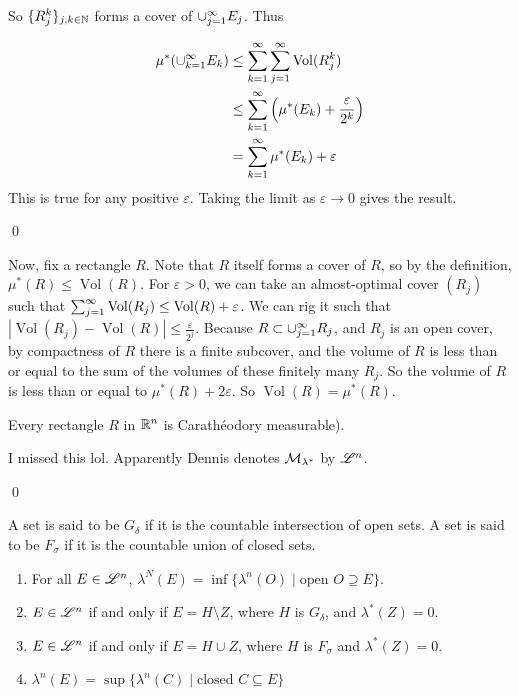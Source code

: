 \documentclass[x11names,reqno,14pt]{extarticle}
\newcommand{\seq}[1]{_{#1 = 1}^\oo}
\DeclareMathOperator{\Vol}{Vol}
\begin{document}
So $\{R^k_j\}_{j, k \in \mathbb{N}}$ forms a cover of $\cup\seq{j}E_j$. Thus

\begin{align*}
\mu^*(\cup\seq{k}E_k) & \leq \sum\seq{k}\sum\seq{j}\Vol(R_j^k) \\
& \leq \sum\seq{k}\left(\mu^*(E_k) + \frac{\varepsilon}{2^k}\right) \\
& = \sum\seq{k}\mu^*(E_k) + \varepsilon
\end{align*}
This is true for any positive $\varepsilon$. Taking the limit as $\varepsilon\to0$ gives the result. 

\qed

Now, fix a rectangle $R$. Note that $R$ itself forms a cover of $R$, so by the definition, $\mu^*(R) \leq \Vol(R)$. For $\varepsilon > 0$, we can take an almost-optimal cover $(R_j)$ such that $\sum\seq{j}\Vol(R_j) \leq \Vol(R) + \varepsilon$. We can rig it such that $|\Vol(R_j) - \Vol(R)| \leq \frac{\varepsilon}{2^j}$.  Because $R \subset\cup\seq{j}R_j$, and $R_j$ is an open cover, by compactness of $R$ there is a finite subcover, and the volume of $R$ is less than or equal to the sum of the volumes of these finitely many $R_j$. So the volume of $R$ is less than or equal to $\mu^*(R) + 2\varepsilon$. So $\Vol(R) = \mu^*(R)$.

\prop 

Every rectangle $R$ in $\mathbb{R}^n$ is Carath\'eodory measurable). 

\proof

I missed this lol. Apparently Dennis denotes $\mathcal{M}_{\lambda^*}$ by $\mathscr{L}^n$.

\qed


A set is said to be \underline{$G_\delta$} if it is the countable intersection of open sets. A set is said to be \underline{$F_\sigma$} if it is the countable union of closed sets. 

\thm

\begin{enumerate}

\item For all $E \in \mathscr{L}^n$, $\lambda^N(E) = \inf\{\lambda^n(O) \mid \text{open }O\supseteq E\}$. 

\item $E \in \mathscr{L}^n$ if and only if $E = H\setminus Z$, where $H$ is $G_\delta$, and $\lambda^*(Z) = 0$. 

\item $E \in \mathscr{L}^n$ if and only if $E = H \cup Z$, where $H$ is $F_\sigma$ and $\lambda^*(Z) = 0$. 

\item $\lambda^n(E) = \sup\{\lambda^n(C) \mid \text{closed }C \subseteq E\}$

\end{enumerate}
\end{document}
